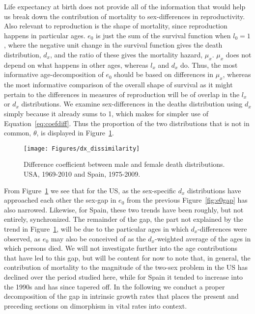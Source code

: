 Life expectancy at birth does not provide all of the information that would help
us break down the contribution of mortality to sex-differences in
reproductivity. Also relevant to reproduction is the shape of mortality, since
reproduction happens in particular ages. $e_0$ is just the sum of the survival
function when $l_0 = 1$, where the negative unit change in the survival function gives the death distribution, $d_x$, and the ratio of these gives the mortality hazard, $\mu _x$. $\mu_x$ does not depend on what happens in other ages, whereas $l_x$ and $d_x$ do. Thus, the
most informative age-decomposition of $e_0$ should be based on differences in
$\mu _x$, whereas the most informative comparison of the overall shape of
survival as it might pertain to the differences in measures of reproduction
will be of overlap in the $l_x$ or $d_x$ distributions. We examine
sex-differences in the deaths distribution using $d_x$ simply
because it already sums to 1, which makes for simpler use of
Equation~\eqref{eq:coefdiff}. Thus the proportion of the two distributions that
is not in common, $\theta$, is displayed in Figure~\ref{fig:dxtheta}.

\begin{figure}[!ht]
  \centering
    \caption{Difference coefficient between male and female death distributions.
    USA, 1969-2010 and Spain, 1975-2009.}
     \texttt{[image: Figures/dx\_dissimilarity]}
     \label{fig:dxtheta}
\end{figure}

From Figure~\ref{fig:dxtheta} we see that for the US, as the sex-specific $d_x$
distributions have approached each other the sex-gap in $e_0$ from the previous
Figure~\ref{fig:e0gap} has also narrowed. Likewise, for Spain, these two trends
have been roughly, but not entirely, synchronized. The remainder of the gap, the
part not explained by the trend in Figure~\ref{fig:dxtheta}, will be due to the
particular ages in which $d_x$-differences were observed, as $e_0$ may also be
conceived of as the $d_x$-weighted average of the ages in which persons died. We
will not investigate further into the age contributions that have led to this
gap, but will be content for now to note that, in general, the
contribution of mortality to the magnitude of the two-sex problem in the US has
declined over the period studied here, while for Spain it tended to increase 
into the 1990s and has since tapered off. In the following we conduct
a proper decomposition of the gap in intrinsic growth rates that places the
present and preceding sections on dimorphism in vital rates into context.

 \FloatBarrier
